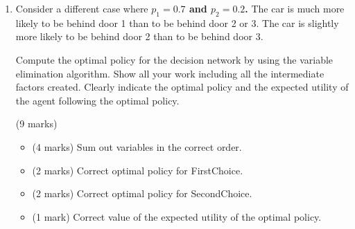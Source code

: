 \documentclass[12pt]{article}
\begin{document}
\begin{enumerate}
Compute the optimal policy for the decision network by applying the variable elimination algorithm. Show all your work including all the intermediate factors created. Clearly indicate the optimal policy and the expected utility of the agent following the optimal policy.

\begin{markscheme}

(9 marks)

\begin{itemize}
    \item (4 marks) Sum out variables in the correct order.
    \item (2 marks) Correct optimal policy for FirstChoice.
    \item (2 marks) Correct optimal policy for SecondChoice.
    \item (1 mark) Correct value of the expected utility of the optimal policy.
\end{itemize}    

\end{markscheme}
    
    
\item

Consider a different case where {\bf $p_1 = 0.7$ and $p_2 = 0.2$.}  The car is much more likely to be behind door 1 than to be behind door 2 or 3. The car is slightly more likely to be behind door 2 than to be behind door 3.

Compute the optimal policy for the decision network by using the variable elimination algorithm. Show all your work including all the intermediate factors created. Clearly indicate the optimal policy and the expected utility of the agent following the optimal policy.

\begin{markscheme}

(9 marks)

\begin{itemize}
\item (4 marks) Sum out variables in the correct order.
\item (2 marks) Correct optimal policy for FirstChoice.
\item (2 marks) Correct optimal policy for SecondChoice.
\item (1 mark) Correct value of the expected utility of the optimal policy.
\end{itemize}    

\end{markscheme}
    
      
\end{enumerate}
\end{document}
